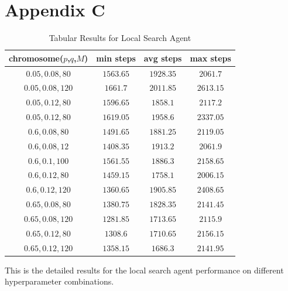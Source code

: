 \documentclass[letterpaper]{article} %
\begin{document}
\section{Appendix C}
\begin{table}[h!]
  \centering
  \normalsize{
    \begin{spacing}{1.9}
    \begin{tabular}{ |cccc| } 
      \hline
      chromosome($p$,$q$,$M$) & min steps & avg steps & max steps  \\ 
      \hline
      \hline
      $0.05, 0.08, 80$  & $1563.65$       & $1928.35$        & $2061.7$\\
      $0.05, 0.08, 120$ & $1661.7$        & $2011.85$        & $2613.15$\\
      $0.05, 0.12, 80$  & $1596.65$       & $1858.1$         & $2117.2$\\
      $0.05, 0.12, 80$  & $1619.05$       & $1958.6$         & $2337.05$\\
      $0.6, 0.08, 80$   & $1491.65$         & $1881.25$      & $2119.05$\\
      $0.6, 0.08, 12$   & $1408.35$         & $1913.2$       & $2061.9$\\
      $0.6, 0.1, 100$   & $1561.55$         & $1886.3$       & $2158.65$\\
      $0.6, 0.12, 80$   & $1459.15$         & $1758.1$       & $2006.15$\\
      $0.6, 0.12, 120$  & $1360.65$         & $1905.85$      & $2408.65$\\
      $0.65, 0.08, 80$  & $1380.75$         & $1828.35$      & $2141.45$\\
      $0.65, 0.08, 120$ & $1281.85$         & $1713.65$      & $2115.9$\\
      $0.65, 0.12, 80$  & $1308.6$         & $1710.65$       & $2156.15$\\
      $0.65, 0.12, 120$ & $1358.15$         & $1686.3$       & $2141.95$ \\ 
      \hline
    \end{tabular}
  \end{spacing}
  }
  \caption{Tabular Results for Local Search Agent}
  \medskip
  \footnotesize
  This is the detailed results for the local search agent performance on different hyperparameter combinations.
  \label{tab:tabularResultGA}
\end{table}  
  \newpage
\end{document}
